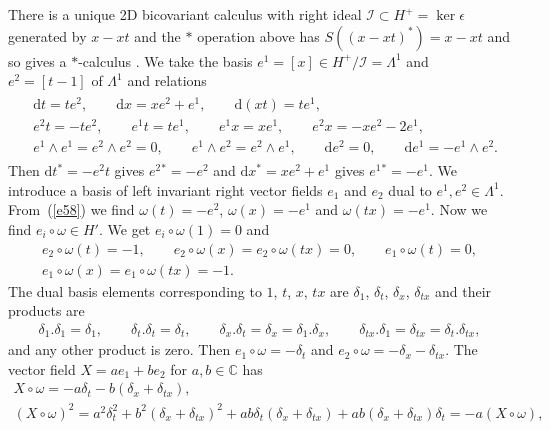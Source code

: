 \documentclass[10pt,a4paper]{amsart}
\numberwithin{equation}{section}
\newcommand{\extd}{\mathrm{d}}
\newcommand{\C}{\mathbb{C}}
\newcommand{\<}{\langle}
\renewcommand{\>}{\rangle}
\begin{document}
There is a unique 2D bicovariant calculus with right ideal $ \mathcal{I}\subset H^{+} = \ker\epsilon $ generated by $ x-xt $ and the $ * $ operation above has $ S((x-xt)^{*})= x-xt $ and so gives a $ * $-calculus \cite{BMbook}. We take the basis $ e^{1}=[x]\in H^{+}/\mathcal{I}=\Lambda ^{1}$ and $ e^{2}=[t-1] $ of $ \Lambda ^{1} $ and relations
\begin{gather*}
\begin{split}
&	\extd t =t e^{2}, \qquad \extd x= x e^{2}+e^{1}, \qquad \extd (x t)=t e^{1},\\
&	e^{2} t	=- t e^{2}, \qquad e^{1} t	= t e^{1}, \qquad e^{1} x= x e^{1}, \qquad e^{2} x= -x e^{2}-2e^{1},\\
&	e^{1} \wedge e^{1}=e^{2} \wedge e^{2}=0,\qquad e^{1} \wedge e^{2}= e^{2} \wedge e^{1}, \qquad \extd e^{2}=0, \qquad \extd e^{1}=- e^{1} \wedge e^{2}.
\end{split}
\end{gather*}
Then $ \extd t^{*}=-e^{2} t$ gives $ e^{2}{}^{*}=-e^{2} $ and $ \extd x^{*}= x e^{2}+ e^{1}$ gives $ e^{1}{}^{*}=- e^{1} $. We introduce a basis of left invariant right vector fields $ e_{1} $ and $ e_{2} $ dual to $ e^{1},e^{2} \in \Lambda^{1}$. From~(\ref{e58}) we find $ \omega (t)= -e^{2} $, $ \omega (x)= -e^{1} $ and $ \omega (tx)= -e^{1} $. Now we find $ e_{i}\circ \omega \in H' $. We get $ e_{i}\circ \omega (1)=0 $ and
\begin{gather*}
e_{2}\circ \omega (t)=-1, \qquad e_{2}\circ \omega (x)=e_{2}\circ \omega (tx)=0, \qquad e_{1}\circ \omega (t)=0, \\
 e_{1}\circ \omega (x)=e_{1}\circ \omega (tx)=-1.
\end{gather*}
The dual basis elements corresponding to $ 1$, $t$, $x$, $tx $ are $ \delta_{1}$, $\delta_{t}$, $\delta_{x}$, $\delta_{tx} $ and their products are
\begin{align*}
	\delta_{1}. \delta_{1}= \delta_{1}, \qquad \delta_{t}. \delta_{t}= \delta_{t}, \qquad \delta_{x}. \delta_{t}= \delta_{x}=\delta_{1}. \delta_{x}, \qquad \delta_{tx}. \delta_{1}= \delta_{tx}=\delta_{t}. \delta_{tx},
\end{align*}
and any other product is zero. Then $ e_{1}\circ \omega=-\delta_{t} $ and $ e_{2}\circ \omega=-\delta_{x} -\delta_{tx} $. The vector field $ X=a e_{1}+b e_{2}$ for $ a,b \in \C $ has
\begin{gather*}
X \circ \omega = -a \delta_{t}-b (\delta_{x} +\delta_{tx} ),\\
	(X \circ \omega)^{2}	 = a ^{2} \delta^{2}_{t}+b^{2}(\delta_{x} +\delta_{tx} )^{2}+ab \delta_{t}(\delta_{x} +\delta_{tx} )+ab (\delta_{x} +\delta_{tx} )\delta_{t}= -a (X \circ \omega),
\end{gather*}
\end{document}
